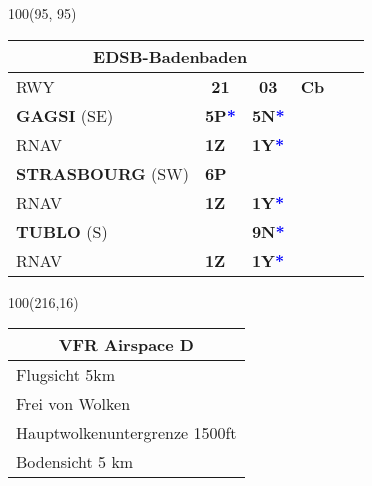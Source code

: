 \documentclass[10pt,landscape,a4paper]{article}
\begin{document}
\begin{textblock}{100}(95, 95)
\begin{table}[]
\begin{tabular}{|llllll}
\multicolumn{4}{c}{\textbf{EDSB-Badenbaden}} \\ \hline
\multicolumn{1}{|l|}{RWY} 									& \multicolumn{1}{c|}{\textbf{21}} 			& \multicolumn{1}{c|}{\textbf{03}}  				& \multicolumn{1}{c|}{\textbf{Cb}} 							\\ \hline
\multicolumn{1}{|l|}{\textbf{GAGSI} (SE)}							& \multicolumn{1}{l|}{\textbf{5P\textcolor{blue}{*}}}& \multicolumn{1}{l|}{\textbf{5N\textcolor{blue}{*}}} 	& \multicolumn{1}{c|}{\multirow{6}{*}{\rotatebox{90}{FL70}}}		\\ \cline{1-3}
\multicolumn{1}{|l|}{RNAV}									& \multicolumn{1}{l|}{\textbf{1Z} }			& \multicolumn{1}{l|}{\textbf{1Y\textcolor{blue}{*}}}	& \multicolumn{1}{c|}{}  								\\ \cline{1-3}

\multicolumn{1}{|l|}{\textbf{STRASBOURG} (SW)} 						& \multicolumn{1}{l|}{\textbf{6P}} 			& \multicolumn{1}{l|}{\textbf{}}					& \multicolumn{1}{c|}{} 								\\ \cline{1-3}
\multicolumn{1}{|l|}{RNAV}									& \multicolumn{1}{l|}{\textbf{1Z}}			& \multicolumn{1}{l|}{\textbf{1Y\textcolor{blue}{*}}}		& \multicolumn{1}{c|}{} 							\\ \cline{1-3} 

\multicolumn{1}{|l|}{\textbf{TUBLO} (S)} 							& \multicolumn{1}{l|}{}					& \multicolumn{1}{l|}{\textbf{9N\textcolor{blue}{*}}}	& \multicolumn{1}{c|}{}								\\\cline{1-3} 
\multicolumn{1}{|l|}{RNAV} 									& \multicolumn{1}{l|}{\textbf{1Z}} 			& \multicolumn{1}{l|}{\textbf{1Y\textcolor{blue}{*}}}	& \multicolumn{1}{c|}{}  								\\ \hline
\end{tabular}
\end{table}
\end{textblock}

\begin{textblock}{100}(216,16)
\begin{table}[]
\begin{tabular}{|l|}
\multicolumn{1}{c}{\textbf{VFR Airspace D}} \\ \hline
 Flugsicht 5km   \\ \hline
Frei von Wolken   \\ \hline
Hauptwolkenuntergrenze 1500ft \\ \hline
Bodensicht 5 km \\ \hline
\end{tabular}
\end{table}
\end{textblock}
\end{document}
